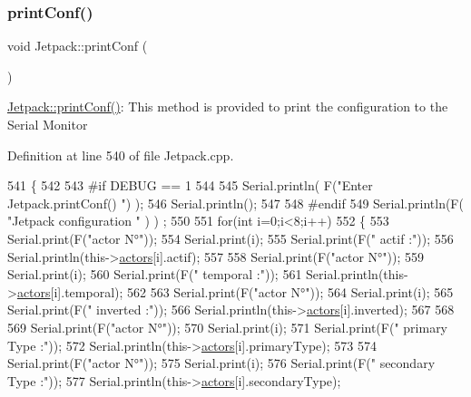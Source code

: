 \subsubsection{\texorpdfstring{print\+Conf()}{printConf()}}
{\footnotesize\ttfamily void Jetpack\+::print\+Conf (\begin{DoxyParamCaption}{ }\end{DoxyParamCaption})}

\hyperlink{class_jetpack_ac54a7bb4f9166bee32052253d9b1d306}{Jetpack\+::print\+Conf()}\+: This method is provided to print the configuration to the Serial Monitor 

Definition at line 540 of file Jetpack.\+cpp.


\begin{DoxyCode}
541 \{
542 
543 \textcolor{preprocessor}{#if DEBUG == 1 }
544 
545     Serial.println( F(\textcolor{stringliteral}{"Enter Jetpack.printConf() "}) );
546     Serial.println();
547 
548 \textcolor{preprocessor}{#endif }
549     Serial.println(F( \textcolor{stringliteral}{"Jetpack configuration "} ) ) ;
550  
551         \textcolor{keywordflow}{for}(\textcolor{keywordtype}{int} i=0;i<8;i++)
552     \{   
553         Serial.print(F(\textcolor{stringliteral}{"actor N°"}));
554         Serial.print(i);
555         Serial.print(F(\textcolor{stringliteral}{" actif :"}));
556         Serial.println(this->\hyperlink{class_jetpack_a7e16d2f97837f9712a2e6de1c50d99db}{actors}[i].actif);
557         
558         Serial.print(F(\textcolor{stringliteral}{"actor N°"}));
559         Serial.print(i);
560         Serial.print(F(\textcolor{stringliteral}{" temporal :"}));
561         Serial.println(this->\hyperlink{class_jetpack_a7e16d2f97837f9712a2e6de1c50d99db}{actors}[i].temporal);
562 
563         Serial.print(F(\textcolor{stringliteral}{"actor N°"}));
564         Serial.print(i);
565         Serial.print(F(\textcolor{stringliteral}{" inverted :"}));
566         Serial.println(this->\hyperlink{class_jetpack_a7e16d2f97837f9712a2e6de1c50d99db}{actors}[i].inverted);
567 
568 
569         Serial.print(F(\textcolor{stringliteral}{"actor N°"}));
570         Serial.print(i);
571         Serial.print(F(\textcolor{stringliteral}{" primary Type :"}));
572         Serial.println(this->\hyperlink{class_jetpack_a7e16d2f97837f9712a2e6de1c50d99db}{actors}[i].primaryType);
573 
574         Serial.print(F(\textcolor{stringliteral}{"actor N°"}));
575         Serial.print(i);
576         Serial.print(F(\textcolor{stringliteral}{" secondary Type :"}));       
577         Serial.println(this->\hyperlink{class_jetpack_a7e16d2f97837f9712a2e6de1c50d99db}{actors}[i].secondaryType);

\end{DoxyCode}
